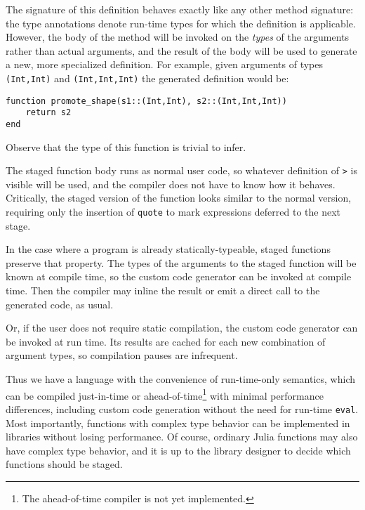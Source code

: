 The signature of this definition behaves exactly like any other method
signature: the type annotations denote run-time types for which the
definition is applicable. However, the body of the method will be invoked
on the \emph{types} of the arguments rather than actual arguments, and the
result of the body will be used to generate a new, more specialized
definition. For example, given arguments of types
{\tt (Int,Int)} and {\tt (Int,Int,Int)} the generated definition would be:

\vspace{-0.2in}
\begin{singlespace}
\begin{verbatim}
function promote_shape(s1::(Int,Int), s2::(Int,Int,Int))
    return s2
end
\end{verbatim}
\end{singlespace}

Observe that the type of this function is trivial to infer.

The staged function body runs as normal user code, so whatever definition
of {\tt >} is visible will be used, and the compiler does not have to know
how it behaves. Critically, the staged version of the function looks
similar to the normal version, requiring only the insertion of {\tt quote}
to mark expressions deferred to the next stage.

In the case where a program is already statically-typeable, staged
functions preserve that property. The types of the arguments to the
staged function will be known at compile time, so the custom code
generator can be invoked at compile time. Then the compiler may inline
the result or emit a direct call to the generated code, as usual.

Or, if the user does not require static compilation, the custom code
generator can be invoked at run time. Its results are cached for each new
combination of argument types, so compilation pauses are infrequent.

Thus we have a language with the convenience of run-time-only semantics,
which can be compiled just-in-time or ahead-of-time\footnote{The ahead-of-time
compiler is not yet implemented.} with minimal performance differences,
including custom code generation without the need for run-time {\tt eval}.
Most importantly, functions with complex type behavior can be implemented
in libraries without losing performance. Of course, ordinary Julia
functions may also have complex type behavior, and it is up to the
library designer to decide which functions should be staged.


